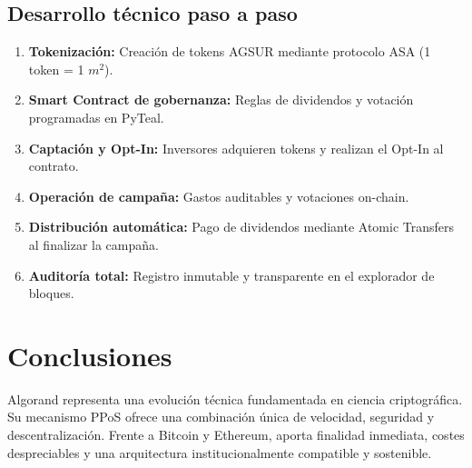 \documentclass[12pt]{article}
\begin{document}
\subsection{Desarrollo técnico paso a paso}
\begin{enumerate}
    \item \textbf{Tokenización:} Creación de tokens AGSUR mediante protocolo ASA (1 token = 1 $m^2$).
    \item \textbf{Smart Contract de gobernanza:} Reglas de dividendos y votación programadas en PyTeal.
    \item \textbf{Captación y Opt-In:} Inversores adquieren tokens y realizan el Opt-In al contrato.
    \item \textbf{Operación de campaña:} Gastos auditables y votaciones on-chain.
    \item \textbf{Distribución automática:} Pago de dividendos mediante Atomic Transfers al finalizar la campaña.
    \item \textbf{Auditoría total:} Registro inmutable y transparente en el explorador de bloques.
\end{enumerate}

\section*{Conclusiones}
Algorand representa una evolución técnica fundamentada en ciencia criptográfica. Su mecanismo PPoS ofrece una combinación única de velocidad, seguridad y descentralización. Frente a Bitcoin y Ethereum, aporta finalidad inmediata, costes despreciables y una arquitectura institucionalmente compatible y sostenible.
\end{document}
